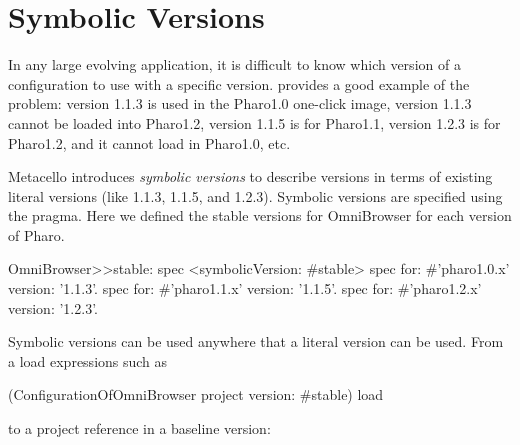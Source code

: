 \documentclass[a4paper,10pt,twoside]{book}
\begin{document}
%
%








\section{Symbolic Versions}
In any large evolving application, it is difficult to know which version of a configuration to use with a specific version. 
 provides a good example of the problem: version 1.1.3 is used in the Pharo1.0 one-click image,  version 1.1.3 cannot be loaded into Pharo1.2, version 1.1.5 is for Pharo1.1, version 1.2.3 is for Pharo1.2, and it cannot load in Pharo1.0, etc. 

Metacello introduces \emph{symbolic versions} to describe versions in terms of existing literal versions (like 1.1.3, 1.1.5, and 1.2.3). Symbolic versions are specified using the  pragma. Here we defined the stable versions for OmniBrowser for each version of Pharo.

\begin{code}{}
OmniBrowser>>stable: spec
     <symbolicVersion: #stable>
     spec for: #'pharo1.0.x' version: '1.1.3'.
     spec for: #'pharo1.1.x' version: '1.1.5'.
     spec for: #'pharo1.2.x' version: '1.2.3'.
\end{code}

Symbolic versions can be used anywhere that a literal version can be used. From a load expressions such as 

\begin{code}{}
(ConfigurationOfOmniBrowser project version: #stable) load
\end{code}

to a project reference in a baseline version:
\end{document}
